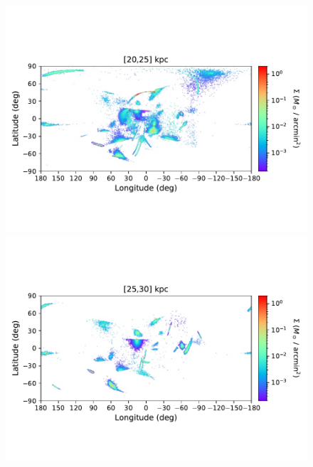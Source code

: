 \begin{figure}[h!]
\begin{center}
            \includegraphics[clip=true, trim = 0mm 20mm 0mm 20mm, width=\columnwidth]{images/PII_ensemble_LB_D20-25_mass_est_new.pdf}
            \includegraphics[clip=true, trim = 0mm 20mm 0mm 20mm, width=\columnwidth]{images/PII_ensemble_LB_D25-30_mass_est_new.pdf}



\end{center}
\end{figure}
